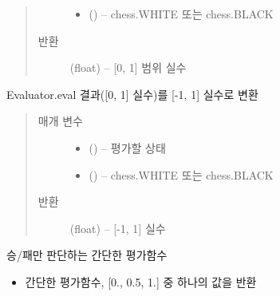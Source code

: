 \documentclass[letterpaper,10pt,english]{sphinxmanual}
\begin{document}
\begin{fulllineitems}
\begin{fulllineitems}
\begin{quote}
\begin{description}
\begin{itemize}
\item {} 
 () -- chess.WHITE 또는 chess.BLACK

\end{itemize}

\item[{반환}] \leavevmode
(float) -- {[}0, 1{]} 범위 실수

\end{description}\end{quote}

\end{fulllineitems}


\begin{fulllineitems}
\label{\detokenize{scripts:scripts.run_game.Evaluator.eval_2}}
Evaluator.eval 결과({[}0, 1{]} 실수)를 {[}-1, 1{]} 실수로 변환
\begin{quote}\begin{description}
\item[{매개 변수}] \leavevmode\begin{itemize}
\item {} 
 ({\hyperref[\detokenize{scripts:scripts.run_game.State}]{}}) -- 평가할 상태

\item {} 
 () -- chess.WHITE 또는 chess.BLACK

\end{itemize}

\item[{반환}] \leavevmode
(float) -- {[}-1, 1{]} 실수

\end{description}\end{quote}

\end{fulllineitems}


\begin{fulllineitems}
\label{\detokenize{scripts:scripts.run_game.Evaluator.win_or_lose}}
승/패만 판단하는 간단한 평가함수
\begin{itemize}
\item {} 
간단한 평가함수, {[}0., 0.5, 1.{]} 중 하나의 값을 반환


\end{itemize}
\end{fulllineitems}
\end{fulllineitems}
\end{document}
